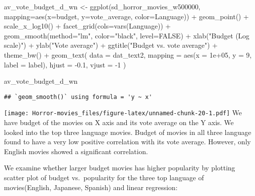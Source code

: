 \documentclass[
]{article}
\newenvironment{Shaded}{\begin{snugshade}}{\end{snugshade}}
\newcommand{\AttributeTok}[1]{\textcolor[rgb]{0.77,0.63,0.00}{#1}}
\newcommand{\ConstantTok}[1]{\textcolor[rgb]{0.00,0.00,0.00}{#1}}
\newcommand{\DecValTok}[1]{\textcolor[rgb]{0.00,0.00,0.81}{#1}}
\newcommand{\FloatTok}[1]{\textcolor[rgb]{0.00,0.00,0.81}{#1}}
\newcommand{\FunctionTok}[1]{\textcolor[rgb]{0.00,0.00,0.00}{#1}}
\newcommand{\NormalTok}[1]{#1}
\newcommand{\OtherTok}[1]{\textcolor[rgb]{0.56,0.35,0.01}{#1}}
\newcommand{\SpecialCharTok}[1]{\textcolor[rgb]{0.00,0.00,0.00}{#1}}
\newcommand{\StringTok}[1]{\textcolor[rgb]{0.31,0.60,0.02}{#1}}
\begin{document}
\begin{Shaded}
\begin{Highlighting}[]
\NormalTok{av\_vote\_budget\_d\_wn }\OtherTok{\textless{}{-}} \FunctionTok{ggplot}\NormalTok{(sd\_horror\_movies\_w500000, }\AttributeTok{mapping=}\FunctionTok{aes}\NormalTok{(}\AttributeTok{x=}\NormalTok{budget, }\AttributeTok{y=}\NormalTok{vote\_average, }\AttributeTok{color=}\NormalTok{Language)) }\SpecialCharTok{+} \FunctionTok{geom\_point}\NormalTok{() }\SpecialCharTok{+} \FunctionTok{scale\_x\_log10}\NormalTok{() }\SpecialCharTok{+} \FunctionTok{facet\_grid}\NormalTok{(}\AttributeTok{cols=}\FunctionTok{vars}\NormalTok{(Language)) }\SpecialCharTok{+} \FunctionTok{geom\_smooth}\NormalTok{(}\AttributeTok{method=}\StringTok{"lm"}\NormalTok{, }\AttributeTok{color=}\StringTok{"black"}\NormalTok{, }\AttributeTok{level=}\ConstantTok{FALSE}\NormalTok{) }\SpecialCharTok{+} \FunctionTok{xlab}\NormalTok{(}\StringTok{"Budget (Log scale)"}\NormalTok{) }\SpecialCharTok{+} \FunctionTok{ylab}\NormalTok{(}\StringTok{"Vote average"}\NormalTok{) }\SpecialCharTok{+} \FunctionTok{ggtitle}\NormalTok{(}\StringTok{"Budget vs. vote average"}\NormalTok{) }\SpecialCharTok{+} \FunctionTok{theme\_bw}\NormalTok{() }\SpecialCharTok{+} \FunctionTok{geom\_text}\NormalTok{(}
  \AttributeTok{data    =}\NormalTok{ dat\_text2,}
  \AttributeTok{mapping =} \FunctionTok{aes}\NormalTok{(}\AttributeTok{x =} \FloatTok{1e+05}\NormalTok{, }\AttributeTok{y =} \DecValTok{9}\NormalTok{, }\AttributeTok{label =}\NormalTok{ label),}
  \AttributeTok{hjust   =} \SpecialCharTok{{-}}\FloatTok{0.1}\NormalTok{,}
  \AttributeTok{vjust   =} \SpecialCharTok{{-}}\DecValTok{1}
\NormalTok{)}

\NormalTok{av\_vote\_budget\_d\_wn}
\end{Highlighting}
\end{Shaded}

\begin{verbatim}
## `geom_smooth()` using formula = 'y ~ x'
\end{verbatim}

\texttt{[image: Horror-movies\_files/figure-latex/unnamed-chunk-20-1.pdf]}
We have budget of the movies on X axis and its vote average on the Y
axis. We looked into the top three language movies. Budget of movies in
all three language found to have a very low positive correlation with
its vote average. However, only English movies showed a significant
correlation.

We examine whether larger budget movies has higher popularity by
plotting scatter plot of budget vs.~popularity for the three top
language of movies(English, Japanese, Spanish) and linear regression:
\end{document}
